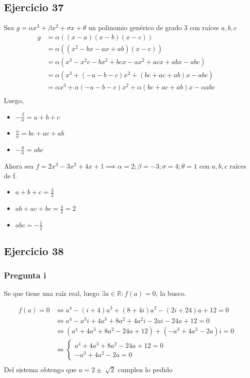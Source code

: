 \subsection{Ejercicio 37}

Sea $ g = \alpha x^3 + \beta x^2 + \sigma x + \theta  $ un polinomio genérico de grado 3 con raíces $ a, b, c $
\begin{align*}
    g&= \alpha((x-a)(x-b)(x-c)) \\
    &= \alpha((x^2 - bx - ax + ab)(x-c)) \\
    &= \alpha(x^3 - x^2c - bx^2 + bcx - ax^2 + acx + abx - abc) \\
    &= \alpha(x^3 + (-a-b-c)x^2 + (bc+ac+ab)x - abc) \\
    &= \alpha x^3 + \alpha(-a-b-c)x^2 + \alpha(bc+ac+ab)x - \alpha abc \\
\end{align*}
Luego,
\begin{itemize}
    \item $ -\frac{\beta}{\alpha} = a+b+c $
    \item $ \frac{\sigma}{\alpha} = bc + ac + ab $
    \item $ -\frac{\theta}{\alpha} = abc $
\end{itemize}
Ahora sea $ f = 2x^3 - 3x^2 + 4x + 1 \implies \alpha = 2; \beta = -3; \sigma = 4; \theta = 1 $ con $ a,b,c $ raíces de f.

\begin{itemize}
    \item $ a+b+c = \frac{3}{2} $
    \item $ ab + ac + bc = \frac{4}{2} = 2 $
    \item $ abc = -\frac{1}{2} $
\end{itemize}

\subsection{Ejercicio 38}

\subsubsection{Pregunta i}
Se que tiene una raíz real, luego $ \exists a \in \mathbb{R}: f(a) = 0 $, la busco.

\begin{align*}
    f(a) = 0 &\iff a^4 - (i+4)a^3 + (8+4i)a^2 -  (2i+24)a + 12 = 0 \\
    &\iff a^4 - a^3i + 4a^3 + 8a^2 + 4a^2i - 2ai - 24a + 12 = 0 \\
    &\iff (a^4 + 4a^3 + 8a^2 - 24a + 12) + (- a^3 + 4a^2 - 2a)i  = 0 \\
    &\iff \begin{cases}
        a^4 + 4a^3 + 8a^2 - 24a + 12 = 0 \\
        - a^3 + 4a^2 - 2a = 0
    \end{cases} \\
\end{align*}
Del sistema obtengo que $ a = 2\pm\sqrt[]{2} $ cumplen lo pedido

